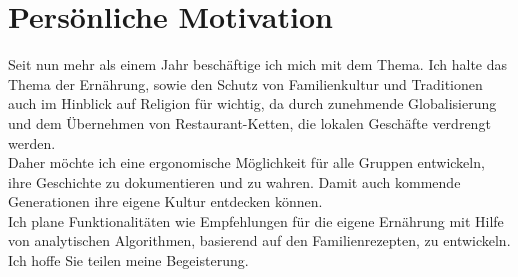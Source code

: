 \documentclass[10pt]{article}
\begin{document}
    \section{Persönliche Motivation}\label{sec:Motivation}
    Seit nun mehr als einem Jahr beschäftige ich mich mit dem Thema. Ich halte das Thema der Ernährung, sowie den Schutz von Familienkultur und Traditionen auch im Hinblick auf Religion für wichtig, da durch zunehmende Globalisierung und dem Übernehmen von Restaurant-Ketten, die lokalen Geschäfte verdrengt werden. \\
    Daher möchte ich eine ergonomische Möglichkeit für alle Gruppen entwickeln, ihre Geschichte zu dokumentieren und zu wahren. Damit auch kommende Generationen ihre eigene Kultur entdecken können. \\
    Ich plane Funktionalitäten wie Empfehlungen für die eigene Ernährung mit Hilfe von analytischen Algorithmen, basierend auf den Familienrezepten, zu entwickeln. \\
    Ich hoffe Sie teilen meine Begeisterung.

    \newpage
     
    
\end{document}
